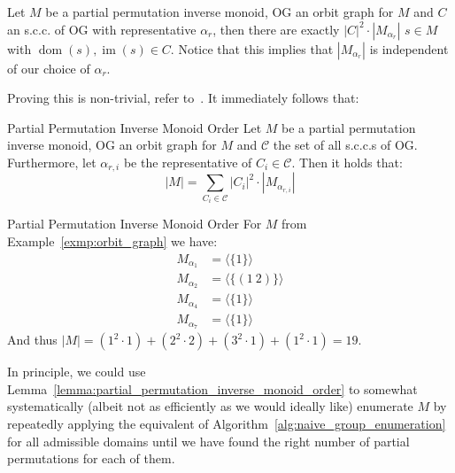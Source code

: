 \begin{lemma}[label=lemma:partial_permutation_inverse_monoid_order]{}
  Let $M$ be a partial permutation inverse monoid, $\mathrm{OG}$ an orbit graph
  for $M$ and $C$ an s.c.c. of $\mathrm{OG}$ with representative $\alpha_r$, then
  there are exactly $|C|^2 \cdot |M_{\alpha_r}|$ $s \in M$ with
  $\operatorname{dom}(s), \operatorname{im}(s) \in C$. Notice that this implies
  that $|M_{\alpha_r}|$ is independent of our choice of $\alpha_r$.
\end{lemma}
%
Proving this is non-trivial, refer to~\cite{Mitchell}. It immediately follows
that:

\begin{corollary}[label=corollary:partial_permutation_inverse_monoid_order]{%
  Partial Permutation Inverse Monoid Order}
  Let $M$ be a partial permutation inverse monoid, $\mathrm{OG}$ an orbit graph
  for $M$ and $\mathcal{C}$ the set of all s.c.c.s of $\mathrm{OG}$. Furthermore,
  let $\alpha_{r,i}$ be the representative of $C_i \in \mathcal{C}$. Then it
  holds that:
  \begin{equation*}
    |M| = \sum_{C_i \in \mathcal{C}} |C_i|^2 \cdot |M_{\alpha_{r,i}}|
  \end{equation*}
\end{corollary}

\begin{exmp}{Partial Permutation Inverse Monoid Order}
  For $M$ from Example~\ref{exmp:orbit_graph} we have:
  \begin{align*}
    M_{\alpha_1} &= \langle \{1\} \rangle \\
    M_{\alpha_2} &= \langle \{(1\ 2)\} \rangle \\
    M_{\alpha_4} &= \langle \{1\} \rangle \\
    M_{\alpha_7} &= \langle \{1\} \rangle
  \end{align*}
  And thus $|M| = (1^2 \cdot 1) + (2^2 \cdot 2) +(3^2 \cdot 1) + (1^2 \cdot 1)
  = 19$.
\end{exmp}
%
In principle, we could use
Lemma~\ref{lemma:partial_permutation_inverse_monoid_order} to somewhat
systematically (albeit not as efficiently as we would ideally like) enumerate
$M$ by repeatedly applying the equivalent of
Algorithm~\ref{alg:naive_group_enumeration} for all admissible domains until we
have found the right number of partial permutations for each of them.
